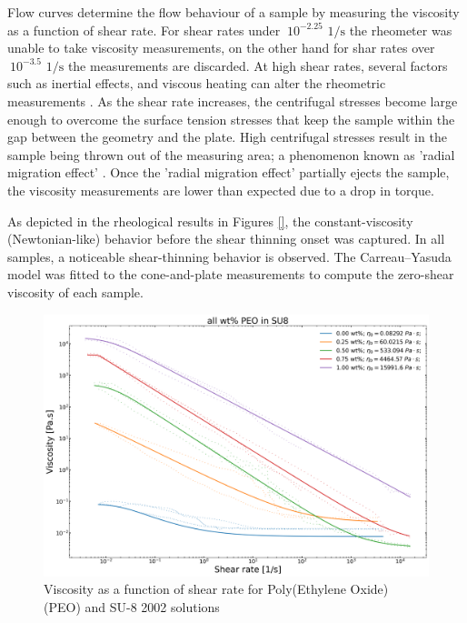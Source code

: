 Flow curves determine the flow behaviour of a sample by measuring the viscosity as a function of shear rate. For shear rates under $~10^{-2.25} \textrm{ 1} / \textrm{s}$ the rheometer was unable to take viscosity measurements, on the other hand for shar rates over $~10^{-3.5} \textrm{ 1} / \textrm{s}$ the measurements are discarded. At high shear rates, several factors such as inertial effects, and viscous heating can alter the rheometric measurements \cite{RByron1987, Macosko1994}. As the shear rate increases, the centrifugal stresses become large enough to overcome the surface tension stresses that keep the sample within the gap between the geometry and the plate. High centrifugal stresses result in the sample being thrown out of the measuring area; a phenomenon known as 'radial migration effect' \cite{Connelly1985}. Once the 'radial migration effect' partially ejects the sample, the viscosity measurements are lower than expected due to a drop in torque. \cite{Pipe2008}

As depicted in the rheological results in Figures \ref{}, the constant-viscosity (Newtonian-like) behavior before the shear thinning onset was captured. In all samples, a noticeable shear-thinning behavior is observed. The Carreau–Yasuda model \cite{RByron1987} was fitted to the cone-and-plate  measurements to compute the zero-shear viscosity of each sample.

\begin{figure}[!th]
\centering
\includegraphics[width=\textwidth]{./Figures/plt_FlowCurves_PEOinSU8.png}
\decoRule
\caption[Viscosity as a function of shear rate for Poly(Ethylene Oxide) (PEO) and SU-8 2002 solutions]{Viscosity as a function of shear rate for Poly(Ethylene Oxide) (PEO) and SU-8 2002 solutions}
\label{fig:plt_FlowCurves_PEOinSU8}
\end{figure}

